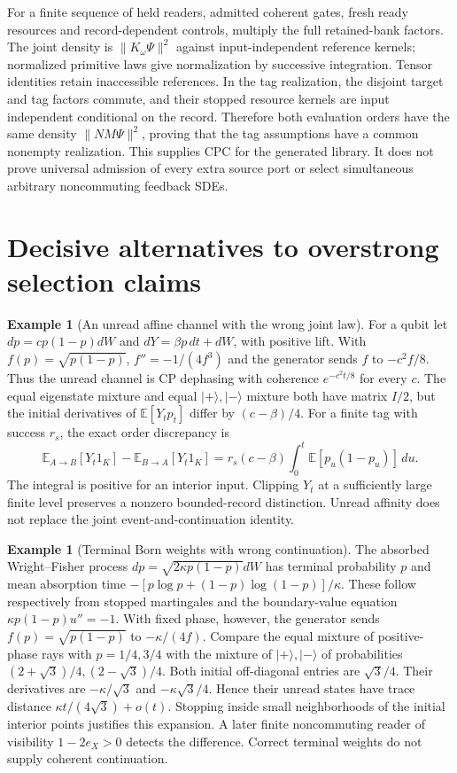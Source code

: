 \documentclass[11pt,oneside,openany]{book}
\theoremstyle{definition}
\newtheorem{example}[theorem]{Example}
\theoremstyle{remark}\newtheorem{remark}[theorem]{Remark}
\begin{document}
For a finite sequence of held readers, admitted coherent gates, fresh ready resources and record-dependent controls, multiply the full retained-bank factors. The joint density is $\|K_\omega\Psi\|^2$ against input-independent reference kernels; normalized primitive laws give normalization by successive integration. Tensor identities retain inaccessible references. In the tag realization, the disjoint target and tag factors commute, and their stopped resource kernels are input independent conditional on the record. Therefore both evaluation orders have the same density $\|N M\Psi\|^2$, proving that the tag assumptions have a common nonempty realization. This supplies CPC for the generated library. It does not prove universal admission of every extra source port or select simultaneous arbitrary noncommuting feedback SDEs.

\section{Decisive alternatives to overstrong selection claims}

\begin{example}[An unread affine channel with the wrong joint law]
For a qubit let
$dp=c p(1-p)dW$ and $dY=\beta p\,dt+dW$, with positive lift. With $f(p)=\sqrt{p(1-p)}$, $f''=-1/(4f^3)$ and the generator sends $f$ to $-c^2f/8$. Thus the unread channel is CP dephasing with coherence $e^{-c^2t/8}$ for every $c$. The equal eigenstate mixture and equal $|+\rangle,|-\rangle$ mixture both have matrix $I/2$, but the initial derivatives of $\mathbb E[Y_tp_t]$ differ by $(c-\beta)/4$. For a finite tag with success $r_s$, the exact order discrepancy is
\[
 \mathbb E_{A\to B}[Y_t1_K]-\mathbb E_{B\to A}[Y_t1_K]
 =r_s(c-\beta)\int_0^t\mathbb E[p_u(1-p_u)]\,du.
\]
The integral is positive for an interior input. Clipping $Y_t$ at a sufficiently large finite level preserves a nonzero bounded-record distinction. Unread affinity does not replace the joint event-and-continuation identity.
\end{example}

\begin{example}[Terminal Born weights with wrong continuation]
The absorbed Wright--Fisher process $dp=\sqrt{2\kappa p(1-p)}dW$ has terminal probability $p$ and mean absorption time
$-[p\log p+(1-p)\log(1-p)]/\kappa$.
These follow respectively from stopped martingales and the boundary-value equation $\kappa p(1-p)u''=-1$. With fixed phase, however, the generator sends $f(p)=\sqrt{p(1-p)}$ to $-\kappa/(4f)$.
Compare the equal mixture of positive-phase rays with $p=1/4,3/4$ with the mixture of $|+\rangle,|-\rangle$ of probabilities $(2+\sqrt3)/4,(2-\sqrt3)/4$. Both initial off-diagonal entries are $\sqrt3/4$. Their derivatives are $-\kappa/\sqrt3$ and $-\kappa\sqrt3/4$. Hence their unread states have trace distance $\kappa t/(4\sqrt3)+o(t)$. Stopping inside small neighborhoods of the initial interior points justifies this expansion. A later finite noncommuting reader of visibility $1-2e_X>0$ detects the difference. Correct terminal weights do not supply coherent continuation.
\end{example}
\end{document}

